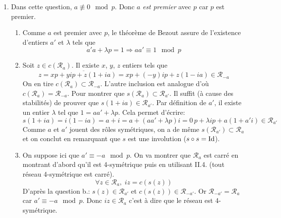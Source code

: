 \begin{enumerate}
\item Dans cette question, $a\not \equiv 0 \mod p$. Donc $a$ \emph{est premier} avec $p$ car $p$ est premier.
\begin{enumerate}
  \item Comme $a$ est premier avec $p$, le théorème de Bezout assure de l'existence d'entiers $a'$ et $\lambda$ tels que 
\begin{displaymath}
  a' a  + \lambda p = 1 \Rightarrow aa' \equiv 1 \mod p
\end{displaymath}

  \item Soit $z\in c(\mathcal{R}_a)$. Il existe $x$, $y$, $z$ entiers tels que 
\begin{displaymath}
 z = \overline{xp + y ip + z(1+ia)}
= xp + (-y)ip + z(1-ia) \in \mathcal{R}_{-a}
\end{displaymath}
On en tire $c(\mathcal{R}_a) \subset \mathcal{R}_{-a}$. L'autre inclusion est analogue d'où $c(\mathcal{R}_a) = \mathcal{R}_{-a}$.\newline
Pour montrer que $s(\mathcal{R}_a) \subset \mathcal{R}_{a'}$. Il suffit (à cause des stabilités) de prouver que $s(1+ia)\in \mathcal{R}_{a'}$.\newline
Par définition de $a'$, il existe un entier $\lambda$ tel que $1 = aa' + \lambda p$. Cela permet d'écrire:
\begin{displaymath}
s(1+ia) = i(1 -ia)= a + i = a +(aa' + \lambda p)i = 0\,p + \lambda ip + a(1+a'i)\in \mathcal{R}_{a'}    
\end{displaymath}
Comme $a$ et $a'$ jouent des rôles symétriques, on a de même $s(\mathcal{R}_{a'})\subset \mathcal{R}_{a}$ et on conclut en remarquant que $s$ est une involution ($s\circ s = \operatorname{Id}$).

  \item On suppose ici que $a'\equiv -a \mod p$. On va montrer que $\mathcal{R}_a$ est carré en montrant d'abord qu'il est 4-symétrique puis en utilisant II.4. (tout réseau 4-symétrique est carré).
\begin{displaymath}
\forall z \in \mathcal{R}_a,\; iz = c(s(z))
\end{displaymath}
D'après la question b.: $s(z)\in \mathcal{R}_{a'}$  et $c(s(z))\in \mathcal{R}_{-a'}$. Or $\mathcal{R}_{-a'} = \mathcal{R}_{a}$ car $a'\equiv -a \mod p$. Donc $iz \in \mathcal{R}_{a}$ c'est à dire que le réseau est 4-symétrique.


\end{enumerate}
\end{enumerate}
